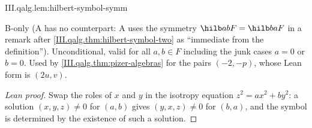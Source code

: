 \begin{lemma}
\bonly
{}
\end{lemma}
\begin{tfformal}{III.qalg.lem:hilbert-symbol-symm}
\begin{tffidelity}
B-only (A has no counterpart: A uses the symmetry $\hilb abF=\hilb baF$ in a remark after \cref{III.qalg.thm:hilbert-symbol-two} as ``immediate from the definition''). Unconditional, valid for all $a,b\in F$ including the junk cases $a=0$ or $b=0$. Used by \cref{III.qalg.thm:pizer-algebras} for the pairs $(-2,-p)$, whose Lean form is $(2u,v)$.
\end{tffidelity}
\end{tfformal}
\begin{proof}[Lean proof]
Swap the roles of $x$ and $y$ in the isotropy equation $z^2=ax^2+by^2$: a solution $(x,y,z)\neq0$ for $(a,b)$ gives $(y,x,z)\neq0$ for $(b,a)$, and the symbol is determined by the existence of such a solution.
\end{proof}

